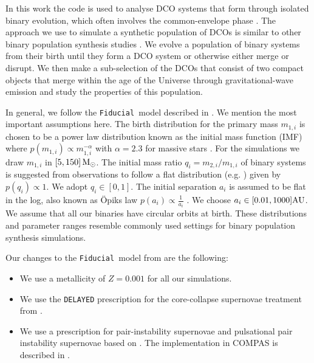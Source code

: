 \documentclass[a4paper,fleqn,usenatbib,useAMS,usedcolumn]{mnras}
\newcommand\Fiducial{\texttt{Fiducial }}
\begin{document}
In this work the code is used to analyse DCO systems that  form through isolated binary evolution, which often involves the common-envelope phase \citep[e.g.][]{SmarrBlandford1976}.  The approach we use to simulate a synthetic population of DCOs is similar to other binary population synthesis studies \citep[including, e.g.,][]{2002MNRAS.329..897H, belczynski2002comprehensive,Dominik:2012kk}. We evolve a population of binary systems from their birth until they form a DCO system or otherwise either merge or disrupt. We then make a sub-selection of the DCOs that consist of two compact objects that merge within the age of the Universe through gravitational-wave emission and study the properties of this population.  

In general, we follow the \Fiducial model described in \citet{2018MNRAS.481.4009V}. We mention the most important assumptions here. 
The birth distribution for the primary mass $m_{1,i}$ is chosen to be a power law distribution known as the initial mass function (IMF) where $p(m_{1,i}) \propto  m_{1,i}^{-\alpha}$ with $\alpha = 2.3$ for massive stars \citep{2001MNRAS.322..231K}. For the simulations we draw $m_{1,i} $ in $[5,150] \, \rm{M}_{\odot}$. 
The initial mass ratio $q_i = m_{2,i} / m_{1,i} $ of binary systems is suggested from observations to follow a flat distribution (e.g. \citealt{1991MNRAS.250..701T,1992ApJ...401..265M, 1994A&A...282..801G, 2012Sci...337..444S}) given by $p(q_i) \propto  1$. We adopt $q_i \in [0,1]$. 
The initial separation $a_i$ is assumed to be flat in the log, also known as \"{O}piks law  $p(a_i) \propto \frac{1 }{a_i}$ \citep{1924PTarO..25f...1O, 1983ARA&A..21..343A}. We choose $a_i \in [0.01, 1000] \rm{AU}$.   We assume that all our binaries have circular orbits at birth. 
These distributions and parameter ranges resemble commonly used settings for binary population synthesis simulations. 

Our changes to the \Fiducial model from  \citet{2018MNRAS.481.4009V}  are the following:
\begin{itemize}
\item We use a metallicity of  $Z = 0.001$  for all our simulations.  
\item We use the \texttt{DELAYED} prescription for the core-collapse supernovae treatment from \citet{2012ApJ...749...91F}. 
\item We use a prescription for pair-instability supernovae and pulsational pair instability supernovae based on \citet{Woosley_2017}.  The implementation in \textsc{COMPAS}  is described in \citet{2019arXiv190402821S}. 
\end{itemize}
\end{document}
